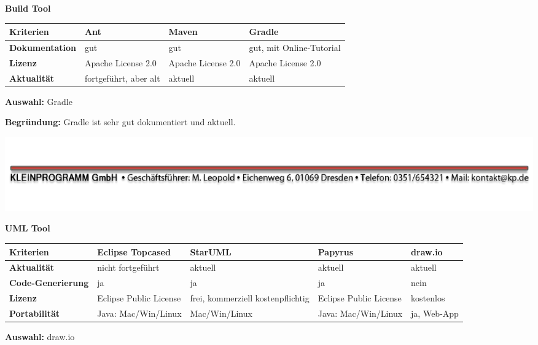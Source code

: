 \documentclass[12pt]{article}
\begin{document}
\vspace*{10mm}

\textbf{Build Tool}

\begin{tabularx}{\textwidth}{|X|X|X|X|}\hline
 \textbf{Kriterien}&\textbf{Ant}&\textbf{Maven}&\textbf{Gradle}\\ \hline
 \textbf{Dokumentation}&gut&gut&gut, mit Online-Tutorial\\ \hline
 \textbf{Lizenz}&Apache License 2.0&Apache License 2.0&Apache License 2.0\\ \hline
 \textbf{Aktualität}&fortgeführt, aber alt&aktuell&aktuell\\ \hline
\end{tabularx}

\vspace*{3mm}

\textbf{Auswahl:} Gradle

\textbf{Begründung:} Gradle ist sehr gut dokumentiert und aktuell.

\vspace*{30mm}
\vspace*{\fill}
\includegraphics[scale=0.9]{footer.pdf}
\thispagestyle{empty}


\textbf{UML Tool}

\begin{tabularx}{\textwidth}{|X|X|X|X|X|}\hline
 \textbf{Kriterien}&\textbf{Eclipse Topcased}&\textbf{StarUML}&\textbf{Papyrus}&\textbf{draw.io}\\ \hline
 \textbf{Aktualität}&nicht fortgeführt&aktuell&aktuell&aktuell\\ \hline
 \textbf{Code-Generierung}&ja&ja&ja&nein\\ \hline
 \textbf{Lizenz}&Eclipse Public License&frei, kommerziell kostenpflichtig&Eclipse Public License&kostenlos\\ \hline
 \textbf{Portabilität}&Java: Mac/Win/Linux&Mac/Win/Linux&Java: Mac/Win/Linux&ja, Web-App\\ \hline
\end{tabularx}

\vspace*{3mm}

\textbf{Auswahl:} draw.io
\end{document}
